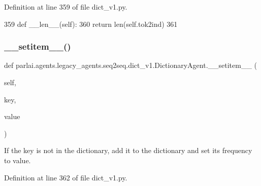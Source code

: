 Definition at line 359 of file dict\+\_\+v1.\+py.


\begin{DoxyCode}
359     \textcolor{keyword}{def }\_\_len\_\_(self):
360         \textcolor{keywordflow}{return} len(self.tok2ind)
361 
\end{DoxyCode}
\mbox{\label{classparlai_1_1agents_1_1legacy__agents_1_1seq2seq_1_1dict__v1_1_1DictionaryAgent_ad9c574fe8296f3058148b6c4d91f7d09}} 
\subsubsection{\texorpdfstring{\+\_\+\+\_\+setitem\+\_\+\+\_\+()}{\_\_setitem\_\_()}}
{\footnotesize\ttfamily def parlai.\+agents.\+legacy\+\_\+agents.\+seq2seq.\+dict\+\_\+v1.\+Dictionary\+Agent.\+\_\+\+\_\+setitem\+\_\+\+\_\+ (\begin{DoxyParamCaption}\item[{}]{self,  }\item[{}]{key,  }\item[{}]{value }\end{DoxyParamCaption})}

\begin{DoxyVerb}If the key is not in the dictionary, add it to the dictionary and set its
frequency to value.
\end{DoxyVerb}
 

Definition at line 362 of file dict\+\_\+v1.\+py.


